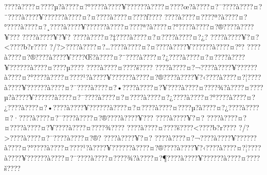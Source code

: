 \documentclass[11pt, openany]{book}
\begin{document}
???\textbar{}?à???\textbar{}?¤???\textbar{}?µ?à???\textbar{}?¤?°???\textbar{}?à???\textbar{}?¥?????\textbar{}?à???\textbar{}?¤???\textbar{}?œ?à???\textbar{}?¤?¯???\textbar{}?à???\textbar{}?¤?¨???\textbar{}?à???\textbar{}?¥?????\textbar{}?à???\textbar{}?¤?¤???\textbar{}?à???\textbar{}?¤???\textbar{}?ƒ???\textbar{}?
???\textbar{}?à???\textbar{}?¤???\textbar{}?ª?à???\textbar{}?¤?°???\textbar{}?à???\textbar{}?¤?¸???\textbar{}?à???\textbar{}?¥?????\textbar{}?à???\textbar{}?¤???\textbar{}?ª?à???\textbar{}?¤?°???\textbar{}?à???\textbar{}?¤?®???\textbar{}?à???\textbar{}?¥???
???\textbar{}?à???\textbar{}?¥?¥?
???\textbar{}?à???\textbar{}?¤?‡???\textbar{}?à???\textbar{}?¤?¤???\textbar{}?à???\textbar{}?¤?¿?
???\textbar{}?à???\textbar{}?¥?¤?\textless{}???\textbar{}?b?r???\textbar{}?
?/?\textgreater{}???\textbar{}?à???\textbar{}?¤?\ldots{}???\textbar{}?à???\textbar{}?¤?¤???\textbar{}?à???\textbar{}?¥?????\textbar{}?à???\textbar{}?¤?°?
???\textbar{}?à???\textbar{}?¤?®???\textbar{}?à???\textbar{}?¥???\textbar{}?Œ?à???\textbar{}?¤?¨???\textbar{}?à???\textbar{}?¤?¿???\textbar{}?à???\textbar{}?¤?¤???\textbar{}?à???\textbar{}?¥?????\textbar{}?à???\textbar{}?¤???\textbar{}?µ???\textbar{}?
???\textbar{}?à???\textbar{}?¤???\textbar{}?š???\textbar{}?
???\textbar{}?à???\textbar{}?¤?¬???\textbar{}?à???\textbar{}?¥?????\textbar{}?à???\textbar{}?¤?°???\textbar{}?à???\textbar{}?¤???\textbar{}?¹?à???\textbar{}?¥?????\textbar{}?à???\textbar{}?¤?®???\textbar{}?à???\textbar{}?¥?‹???\textbar{}?à???\textbar{}?¤?¦???\textbar{}?à???\textbar{}?¥?????\textbar{}?à???\textbar{}?¤?¯???\textbar{}?à???\textbar{}?¤?•???\textbar{}?à???\textbar{}?¤?¥???\textbar{}?à???\textbar{}?¤???\textbar{}?¾?à???\textbar{}?¤???\textbar{}?µ?à???\textbar{}?¥?????\textbar{}?à???\textbar{}?¤?¯???\textbar{}?à???\textbar{}?¤?¤???\textbar{}?à???\textbar{}?¤?¿???\textbar{}?à???\textbar{}?¤?°???\textbar{}?à???\textbar{}?¤?¿???\textbar{}?à???\textbar{}?¤?•???\textbar{}?à???\textbar{}?¥?????\textbar{}?à???\textbar{}?¤?¤???\textbar{}?à???\textbar{}?¤???\textbar{}?µ?à???\textbar{}?¤?¿???\textbar{}?à???\textbar{}?¤?·???\textbar{}?à???\textbar{}?¤?¯???\textbar{}?à???\textbar{}?¤?®???\textbar{}?à???\textbar{}?¥???
???\textbar{}?à???\textbar{}?¥?¤?
???\textbar{}?à???\textbar{}?¤?¤???\textbar{}?à???\textbar{}?¤?¥???\textbar{}?à???\textbar{}?¤???\textbar{}?¾???\textbar{}?
???\textbar{}?à???\textbar{}?¤???\textbar{}?š???\textbar{}?\textless{}???\textbar{}?b?r???\textbar{}?
?/?\textgreater{}???\textbar{}?à???\textbar{}?¤?¯???\textbar{}?à???\textbar{}?¤?®?
???\textbar{}?à???\textbar{}?¥?¤?
???\textbar{}?à???\textbar{}?¤?¬???\textbar{}?à???\textbar{}?¥?????\textbar{}?à???\textbar{}?¤?°???\textbar{}?à???\textbar{}?¤???\textbar{}?¹?à???\textbar{}?¥?????\textbar{}?à???\textbar{}?¤?®???\textbar{}?à???\textbar{}?¥?‹???\textbar{}?à???\textbar{}?¤?¦???\textbar{}?à???\textbar{}?¥?????\textbar{}?à???\textbar{}?¤?¯???\textbar{}?à???\textbar{}?¤???\textbar{}?¾?à???\textbar{}?¤?¶???\textbar{}?à???\textbar{}?¥?????\textbar{}?à???\textbar{}?¤???\textbar{}?š???\textbar{}?
\end{document}
